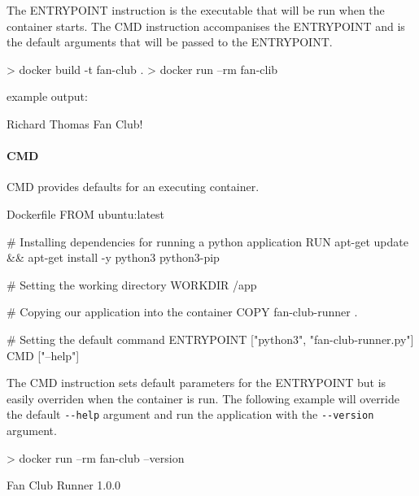 \documentclass{csse4400}
\begin{document}
The ENTRYPOINT instruction is the executable that will be run when the container starts.
The CMD instruction accompanises the ENTRYPOINT and is the default arguments that will be passed to the ENTRYPOINT.

\begin{code}[language=shell,numbers=none]{}
> docker build -t fan-club .
> docker run --rm fan-clib
\end{code}

example output:

\begin{code}[language=shell,numbers=none]{}
Richard Thomas Fan Club!
\end{code}

\paragraph{CMD}
CMD provides defaults for an executing container.

\begin{code}[language=docker,numbers=none]{Dockerfile}
FROM ubuntu:latest

# Installing dependencies for running a python application
RUN apt-get update && apt-get install -y python3 python3-pip

# Setting the working directory
WORKDIR /app

# Copying our application into the container
COPY fan-club-runner .

# Setting the default command
ENTRYPOINT ["python3", "fan-club-runner.py"]
CMD ["--help"]
\end{code}

The CMD instruction sets default parameters for the ENTRYPOINT but is easily overriden when the container is run.
The following example will override the default \texttt{-{}-help} argument and run the application with the \texttt{-{}-version} argument.

\begin{code}[language=shell,numbers=none]{}
> docker run --rm fan-club --version
\end{code}

\begin{code}[language=shell,numbers=none]{}
  Fan Club Runner 1.0.0
\end{code}

\end{document}
